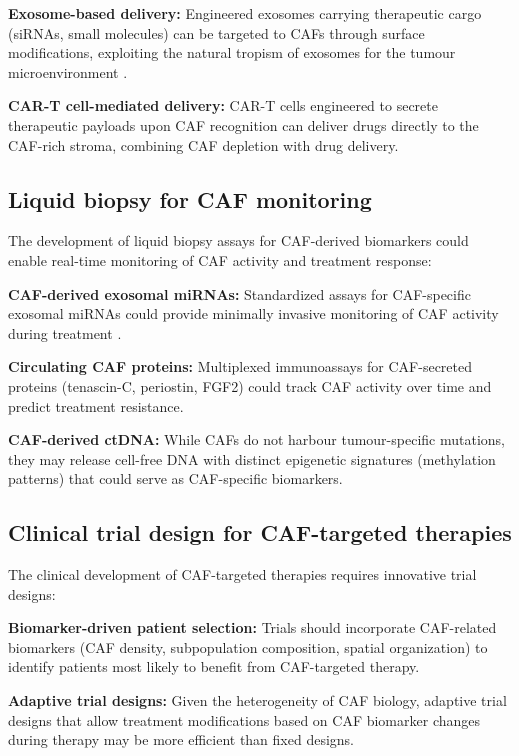 \textbf{Exosome-based delivery:} Engineered exosomes carrying therapeutic cargo (siRNAs, small molecules) can be targeted to CAFs through surface modifications, exploiting the natural tropism of exosomes for the tumour microenvironment \citep{zhao2023}.

\textbf{CAR-T cell-mediated delivery:} CAR-T cells engineered to secrete therapeutic payloads upon CAF recognition can deliver drugs directly to the CAF-rich stroma, combining CAF depletion with drug delivery.

\subsection{Liquid biopsy for CAF monitoring}

The development of liquid biopsy assays for CAF-derived biomarkers could enable real-time monitoring of CAF activity and treatment response:

\textbf{CAF-derived exosomal miRNAs:} Standardized assays for CAF-specific exosomal miRNAs could provide minimally invasive monitoring of CAF activity during treatment \citep{zhao2023}.

\textbf{Circulating CAF proteins:} Multiplexed immunoassays for CAF-secreted proteins (tenascin-C, periostin, FGF2) could track CAF activity over time and predict treatment resistance.

\textbf{CAF-derived ctDNA:} While CAFs do not harbour tumour-specific mutations, they may release cell-free DNA with distinct epigenetic signatures (methylation patterns) that could serve as CAF-specific biomarkers.

\subsection{Clinical trial design for CAF-targeted therapies}

The clinical development of CAF-targeted therapies requires innovative trial designs:

\textbf{Biomarker-driven patient selection:} Trials should incorporate CAF-related biomarkers (CAF density, subpopulation composition, spatial organization) to identify patients most likely to benefit from CAF-targeted therapy.

\textbf{Adaptive trial designs:} Given the heterogeneity of CAF biology, adaptive trial designs that allow treatment modifications based on CAF biomarker changes during therapy may be more efficient than fixed designs.

